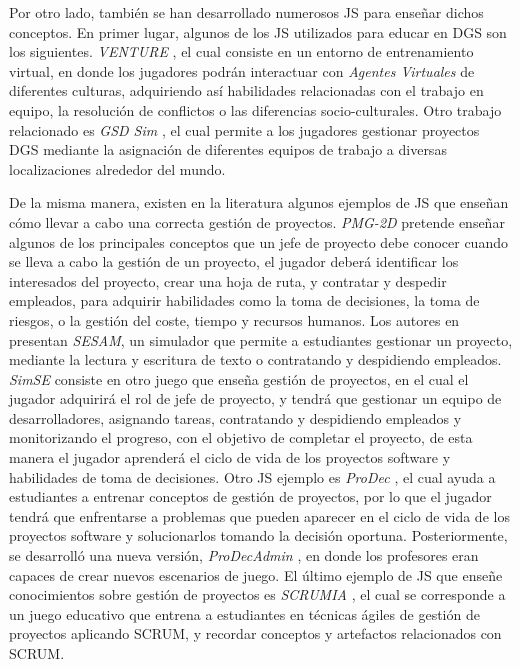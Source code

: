 Por otro lado, también se han desarrollado numerosos JS para enseñar dichos conceptos. En primer lugar, algunos de los JS utilizados para educar en DGS son los siguientes. \emph{VENTURE} \cite{monasor2014global}, el cual consiste en un entorno de entrenamiento virtual, en donde los jugadores podrán interactuar con \emph{Agentes Virtuales} de diferentes culturas, adquiriendo así habilidades relacionadas con el trabajo en equipo, la resolución de conflictos o las diferencias socio-culturales. Otro trabajo relacionado es \emph{GSD Sim} \cite{noll2014gsd}, el cual permite a los jugadores gestionar proyectos DGS mediante la asignación de diferentes equipos de trabajo a diversas localizaciones alrededor del mundo.

De la misma manera, existen en la literatura algunos ejemplos de JS que enseñan cómo llevar a cabo una correcta gestión de proyectos. \emph{PMG-2D} \cite{lino2015project} pretende enseñar algunos de los principales conceptos que un jefe de proyecto debe conocer cuando se lleva a cabo la gestión de un proyecto, el jugador deberá identificar los interesados del proyecto, crear una hoja de ruta, y contratar y despedir empleados, para adquirir habilidades como la toma de decisiones, la toma de riesgos, o la gestión del coste, tiempo y recursos humanos. Los autores en \cite{drappa2000simulation} presentan \emph{SESAM}, un simulador que permite a estudiantes gestionar un proyecto, mediante la lectura y escritura de texto o contratando y despidiendo empleados. \emph{SimSE} \cite{navarro2004simse} consiste en otro juego que enseña gestión de proyectos, en el cual el jugador adquirirá el rol de jefe de proyecto, y tendrá que gestionar un equipo de desarrolladores, asignando tareas, contratando y despidiendo empleados y monitorizando el progreso, con el objetivo de completar el proyecto, de esta manera el jugador aprenderá el ciclo de vida de los proyectos software y habilidades de toma de decisiones. Otro JS ejemplo es \emph{ProDec} \cite{calderon2013prodec}, el cual ayuda a estudiantes a entrenar conceptos de gestión de proyectos, por lo que el jugador tendrá que enfrentarse a problemas que pueden aparecer en el ciclo de vida de los proyectos software y solucionarlos tomando la decisión oportuna. Posteriormente, se desarrolló una nueva versión, \emph{ProDecAdmin} \cite{calderon2017prodecadmin}, en donde los profesores eran capaces de crear nuevos escenarios de juego. El último ejemplo de JS que enseñe conocimientos sobre gestión de proyectos es \emph{SCRUMIA} \cite{von2013scrumia}, el cual se corresponde a un juego educativo que entrena a estudiantes en técnicas ágiles de gestión de proyectos aplicando SCRUM, y recordar conceptos y artefactos relacionados con SCRUM.